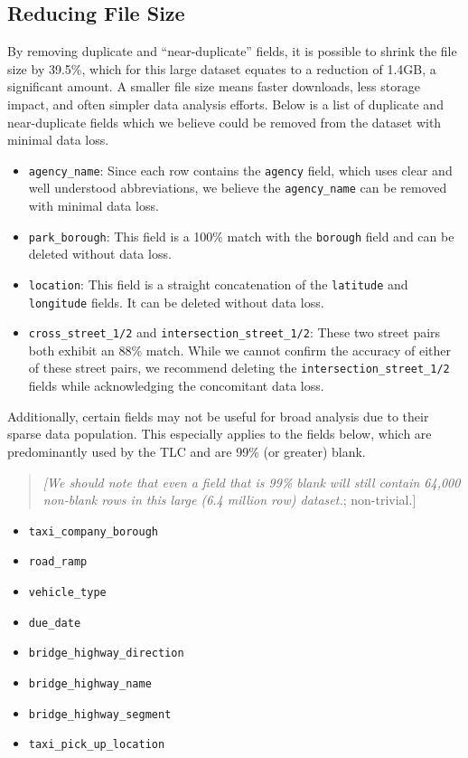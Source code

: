 \documentclass[linenumber]{jdsart}
\begin{document}
\subsection{Reducing File Size}
\label{sec:filesize}
By removing duplicate and ``near-duplicate'' fields, it is possible to 
shrink the file size by 39.5\%, which for this large dataset equates to 
a reduction of 1.4GB, a significant amount. A smaller file size 
means faster downloads, less storage impact, and often 
simpler data analysis efforts. Below is a list of duplicate 
and near-duplicate fields which we believe could be
removed from the dataset with minimal data loss. 

\begin{itemize}[left=1.5em]
    \item \texttt{agency\_name}: Since each row contains the \texttt{agency} 
    field, which uses clear and well understood abbreviations, we believe the
    \texttt{agency\_name} can be removed with minimal data loss.
    
    \item \texttt{park\_borough}: This field is a 100\% match with 
    the \texttt{borough} field and can be deleted without data loss.
    
    \item \texttt{location}: This field is a straight concatenation of 
    the \texttt{latitude} and \texttt{longitude} fields. It can be 
    deleted without data loss.
     
    \item \texttt{cross\_street\_1/2} and \texttt{intersection\_street\_1/2}: 
    These two street pairs both exhibit an 88\% match. While we cannot 
    confirm the accuracy of either of these street pairs, we recommend deleting the 
    \texttt{intersection\_street\_1/2} fields while acknowledging 
    the concomitant data loss.
\end{itemize}

Additionally, certain fields may not be useful for broad analysis
due to their sparse data population. This especially applies to the fields below, 
which are predominantly used by the TLC and are 99\% (or greater) blank.

\begin{quote}
\textit{[We should note that even a field that is 99\% 
blank will still contain 64,000 non-blank rows in this 
large (6.4 million row) dataset.}; non-trivial.]
\end{quote}

\begin{itemize}[left=1.5em]
    \item \texttt{taxi\_company\_borough}
    \item \texttt{road\_ramp}
    \item \texttt{vehicle\_type}
    \item \texttt{due\_date}
    \item \texttt{bridge\_highway\_direction}
    \item \texttt{bridge\_highway\_name}
    \item \texttt{bridge\_highway\_segment}
    \item \texttt{taxi\_pick\_up\_location}
\end{itemize}
\end{document}
